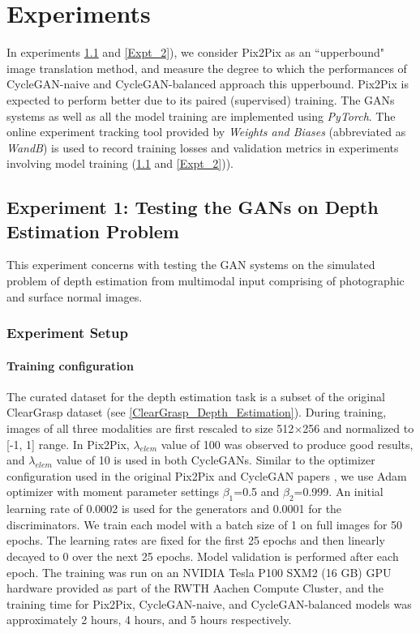 \chapter{Experiments}
\label{Experiments}
In experiments \ref{Expt_1} and \ref{Expt_2}), we consider Pix2Pix as an ``upperbound" image translation method, and measure the degree to which the performances of CycleGAN-naive and CycleGAN-balanced approach this upperbound. Pix2Pix is expected to perform better due to its paired (supervised) training. The GANs systems as well as all the model training are implemented using \textit{PyTorch}. The online experiment tracking tool provided by \textit{Weights and Biases} (abbreviated as \textit{WandB}) is used to record training losses and validation metrics in experiments involving model training (\ref{Expt_1} and \ref{Expt_2})).



\section{Experiment 1: Testing the GANs on Depth Estimation Problem}
\label{Expt_1}

This experiment concerns with testing the GAN systems on the simulated problem of depth estimation from multimodal input comprising of photographic and surface normal images.


\subsection{Experiment Setup}

\subsubsection{Training configuration}
The curated dataset for the depth estimation task is a subset of the original ClearGrasp dataset (see \ref{ClearGrasp_Depth_Estimation}). During training, images of all three modalities are first rescaled to size 512$\times$256 and normalized to [-1, 1] range.  In Pix2Pix, $\lambda_{elem}$ value of 100 was observed to produce good results, and $\lambda_{elem}$ value of 10 is used in both CycleGANs. Similar to the optimizer configuration used in the original Pix2Pix and CycleGAN papers \cite{isola2017image, zhu2017unpaired}, we use Adam optimizer with moment parameter settings $\beta_1$=0.5 and $\beta_2$=0.999. An initial learning rate of 0.0002 is used for the generators and 0.0001 for the discriminators. We train each model with a batch size of 1 on full images for 50 epochs. The learning rates are fixed for the first 25 epochs and then linearly decayed to 0 over the next 25 epochs. Model validation is performed after each epoch. The training was run on an NVIDIA Tesla P100 SXM2 (16 GB) GPU hardware provided as part of the RWTH Aachen Compute Cluster, and the training time for Pix2Pix, CycleGAN-naive, and CycleGAN-balanced models was approximately 2 hours, 4 hours, and 5 hours respectively.

